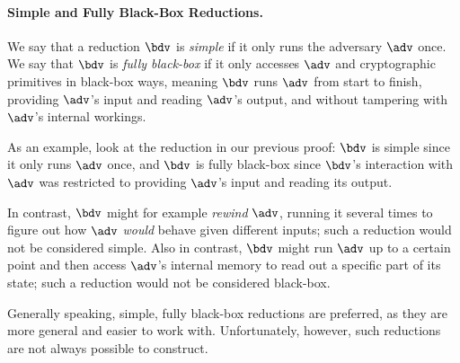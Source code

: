     \noindent
    
    
    \paragraph{Simple and Fully Black-Box Reductions.}
	    We say that a reduction $\bdv$ is \emph{simple} if it only runs the adversary $\adv$ once.
	    We say that $\bdv$ is \emph{fully black-box} if it only accesses $\adv$ and
	    cryptographic primitives in black-box ways,
	    meaning $\bdv$ runs $\adv$ from start to finish,
	    providing $\adv$'s input and reading $\adv$'s output,
	    and without tampering with $\adv$'s internal workings.
	    
	    As an example, look at the reduction in our previous proof:
	    $\bdv$ is simple since it only runs $\adv$ once,
	    and $\bdv$ is fully black-box since
	    $\bdv$'s interaction with $\adv$ was restricted to
	    providing $\adv$'s input and reading its output.
	    
	    In contrast, $\bdv$ might for example \emph{rewind} $\adv$,
	    running it several times to figure out how $\adv$ \emph{would} behave given
	    different inputs; such a reduction would not be considered simple.
	    Also in contrast, $\bdv$ might run $\adv$ up to a certain point
	    and then access $\adv$'s internal memory to read out a specific part of its state;
	    such a reduction would not be considered black-box.
	    
	    Generally speaking, simple, fully black-box reductions are preferred, as
	    they are more general and easier to work with.
	    Unfortunately, however, such reductions are not always possible to construct.
	    
	    
	
